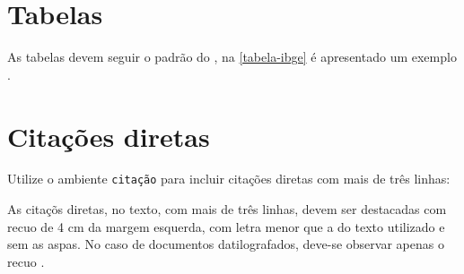 \begin{comment}
	\begin{figure}[!htb]
		\caption{Exemplo}\label{fig_grafico}
		\centering
		\texttt{[image: grafico.pdf]}
		\legend{Fonte: \citeonline[p. 24]{araujo2012}}
	\end{figure}
\end{comment}



\section{Tabelas}
As tabelas devem seguir o padrão do , na  \autoref{tabela-ibge} é apresentado um exemplo .

\begin{table}[!htb]
\end{table}



\section{Citações diretas}

Utilize o ambiente \texttt{citação} para incluir citações diretas com mais de três linhas:

\begin{citacao}
	As citaçõs diretas, no texto, com mais de três linhas, devem ser
	destacadas com recuo de 4 cm da margem esquerda, com letra menor que a do texto
	utilizado e sem as aspas. No caso de documentos datilografados, deve-se
	observar apenas o recuo \cite[5.3]{NBR10520:2002}.
\end{citacao}



